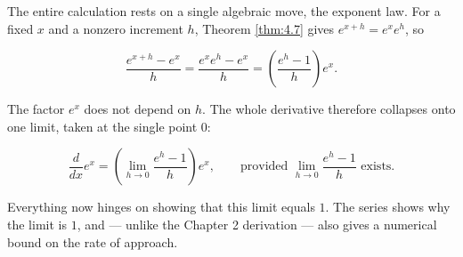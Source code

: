 \documentclass[a4paper,12pt,oneside]{memoir}
\begin{document}
The entire calculation rests on a single algebraic move, the exponent law. For a fixed \(x\) and a nonzero increment \(h\), Theorem \ref{thm:4.7} gives \(e^{x + h} = e^{x} e^{h}\), so

\[ \frac{e^{x + h} - e^{x}}{h} = \frac{e^{x} e^{h} - e^{x}}{h} = \left( \frac{e^{h} - 1}{h} \right) e^{x}. \]

The factor \(e^{x}\) does not depend on \(h\). The whole derivative therefore collapses onto one limit, taken at the single point \(0\):

\[ \frac{d}{dx} e^{x} = \left( \lim_{h \to 0} \frac{e^{h} - 1}{h} \right) e^{x}, \qquad \text{provided } \lim_{h \to 0} \frac{e^{h} - 1}{h} \text{ exists.} \]

Everything now hinges on showing that this limit equals \(1\). The series shows why the limit is \(1\), and — unlike the Chapter 2 derivation — also gives a numerical bound on the rate of approach.
\end{document}
